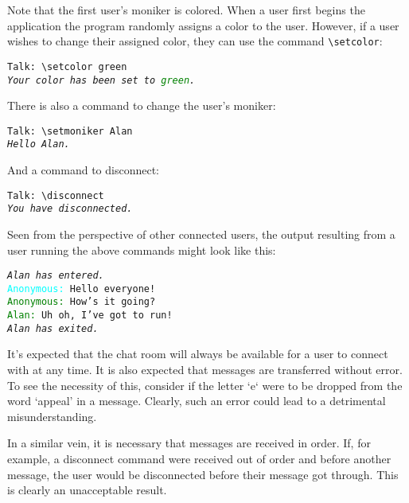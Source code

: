 Note that the first user's moniker is colored. When a user first begins the application the program randomly assigns a color to the user. However, if a user wishes to change their assigned color, they can use the command \texttt{\textbackslash setcolor}:

\begin{displayquote}
	\texttt{Talk: \textbackslash  setcolor green} \\
	\texttt{\emph{Your color has been set to \textcolor{green}{green}.}}
\end{displayquote}

There is also a command to change the user's moniker:

\begin{displayquote}
	\texttt{Talk: \textbackslash  setmoniker Alan} \\
	\texttt{\emph{Hello Alan.}}
\end{displayquote}

And a command to disconnect:

\begin{displayquote}
	\texttt{Talk: \textbackslash  disconnect} \\
	\texttt{\emph{You have disconnected.}}
\end{displayquote}

Seen from the perspective of other connected users, the output resulting from a user running the above commands might look like this:

\begin{displayquote}
	\texttt{\emph{Alan has entered.}} \\
	\texttt{\textcolor{cyan}{Anonymous:} Hello everyone!} \\
	\texttt{\textcolor{green}{Anonymous:} How's it going?} \\
	\texttt{\textcolor{green}{Alan:} Uh oh, I've got to run!} \\
	\texttt{\emph{Alan has exited.}}
\end{displayquote}

It's expected that the chat room will always be available for a user to connect with at any time. It is also expected that messages are transferred without error. To see the necessity of this, consider if the letter `e` were to be dropped from the word `appeal' in a message. Clearly, such an error could lead to a detrimental misunderstanding.

In a similar vein, it is necessary that messages are received in order. If, for example, a disconnect command were received out of order and before another message, the user would be disconnected before their message got through. This is clearly an unacceptable result. 

